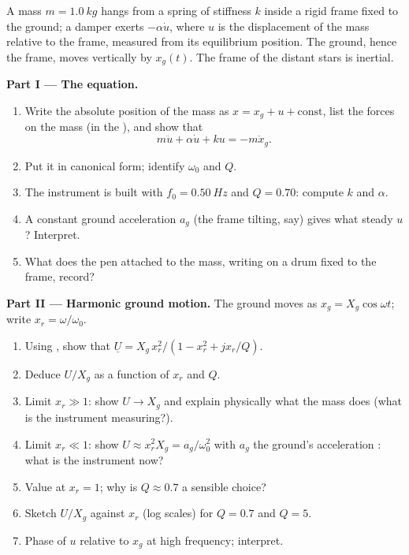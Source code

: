 \begin{problem}
\label{pb:b1:oscillators-resonance:1}
A mass $m = \qty{1.0}{kg}$ hangs from a spring of stiffness $k$ inside
a rigid frame fixed to the ground; a damper exerts $-\alpha\dot u$, where
$u$ is the displacement of the mass relative to the frame, measured
from its equilibrium position. The ground, hence the frame, moves
vertically by $x_g(t)$. The frame of the distant stars is inertial.

\medskip
\noindent\textbf{Part I --- The equation.}
\begin{enumerate}
  \item Write the absolute position of the mass as $x = x_g + u +
        \text{const}$, list the forces on the mass (in the ), and show that
        \[
        m\ddot u + \alpha\dot u + ku = -m\ddot x_g .
        \]
  \item Put it in canonical form; identify $\omega_0$ and $Q$.
  \item The instrument is built with $f_0 = \qty{0.50}{Hz}$ and $Q = 0.70$:
        compute $k$ and $\alpha$.
  \item A constant ground acceleration $a_g$ (the frame tilting, say)
        gives what steady $u$? Interpret.
  \item What does the pen attached to the mass, writing on a drum fixed
        to the frame, record?
\end{enumerate}

\medskip
\noindent\textbf{Part II --- Harmonic ground motion.}
The ground moves as $x_g = X_g\cos\omega t$; write $x_r = \omega/\omega_0$.
\begin{enumerate}[resume]
  \item Using , show that $\underline U = X_g\,x_r^2/
        (1 - x_r^2 + jx_r/Q)$.
  \item Deduce $U/X_g$ as a function of $x_r$ and $Q$.
  \item Limit $x_r \gg 1$: show $U \to X_g$ and explain physically what
        the mass does (what is the instrument measuring?).
  \item Limit $x_r \ll 1$: show $U \approx x_r^2X_g = a_g/\omega_0^2$ with
        $a_g$ the ground's acceleration : what is the instrument
        now?
  \item Value at $x_r = 1$; why is $Q \approx 0.7$ a sensible choice?
  \item Sketch $U/X_g$ against $x_r$ (log scales) for $Q = 0.7$ and
        $Q = 5$.
  \item Phase of $u$ relative to $x_g$ at high frequency; interpret.
\end{enumerate}


\end{problem}
